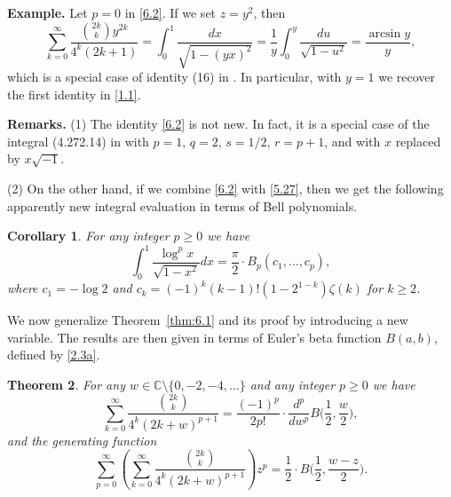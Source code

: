 \documentclass{amsart}
\newtheorem{theorem}{Theorem}[section]
\newtheorem{corollary}[theorem]{Corollary}
\theoremstyle{definition}
\theoremstyle{remark}
\numberwithin{equation}{section}
\begin{document}
\noindent
{\bf Example.} Let $p=0$ in \eqref{6.2}. If we set $z=y^2$, then
\[
\sum_{k=0}^\infty\frac{\binom{2k}{k}y^{2k}}{4^k(2k+1)}
=\int_0^1\frac{dx}{\sqrt{1-(yx)^2}}
=\frac{1}{y}\int_0^y\frac{du}{\sqrt{1-u^2}} = \frac{\arcsin{y}}{y},
\]
which is a special case of identity (16) in \cite{DV}. In particular, with 
$y=1$ we recover the first identity in \eqref{1.1}.

\medskip
\noindent
{\bf Remarks.}
(1) The identity \eqref{6.2} is not new. In fact, it is a special case of the
integral (4.272.14) in \cite[p.~552]{GR} with $p=1$, $q=2$, $s=1/2$, $r=p+1$, 
and with $x$ replaced by $x\sqrt{-1}$.

(2) On the other hand, if we combine \eqref{6.2} with \eqref{5.27}, then we get
the following apparently new integral evaluation in terms of Bell polynomials.

\begin{corollary}\label{cor:6.2}
For any integer $p\geq 0$ we have
\begin{equation}\label{6.5}
\int_0^1\frac{\log^p{x}}{\sqrt{1-x^2}}dx
= \frac{\pi}{2}\cdot B_p(c_1,\ldots, c_p),
\end{equation}
where $c_1=-\log{2}$ and $c_k=(-1)^k(k-1)!(1-2^{1-k})\zeta(k)$ for $k\geq 2$.
\end{corollary}

We now generalize Theorem~\ref{thm:6.1} and its proof by introducing a new
variable. The results are then given in terms of Euler's beta function
$B(a,b)$, defined by \eqref{2.3a}.

\begin{theorem}\label{thm:6.3}
For any $w\in{\mathbb C}\setminus\{0,-2,-4,\ldots\}$ and any integer $p\geq 0$ 
we have
\begin{equation}\label{6.6}
\sum_{k=0}^\infty\frac{\binom{2k}{k}}{4^k(2k+w)^{p+1}}
=\frac{(-1)^p}{2p!}\cdot\frac{d^p}{dw^p}B\big(\frac{1}{2},\frac{w}{2}\big),
\end{equation}
and the generating function
\begin{equation}\label{6.7}
\sum_{p=0}^\infty
\left(\sum_{k=0}^\infty\frac{\binom{2k}{k}}{4^k(2k+w)^{p+1}}\right)z^p
=\frac{1}{2}\cdot B\big(\frac{1}{2},\frac{w-z}{2}\big).
\end{equation}
\end{theorem}
\end{document}
